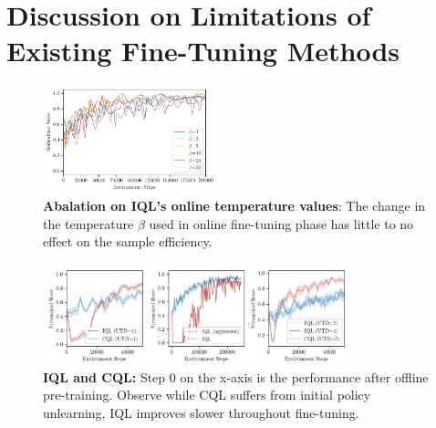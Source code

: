 \section{Discussion on Limitations of Existing Fine-Tuning Methods}
\label{appendix:more_discussion_on_finetuning}

\begin{figure}[h]
\begin{center}
\centerline{\includegraphics[width=0.45\textwidth]{chapters/cal_ql/figs-sample/iql-beta.pdf}}

\caption{\label{fig:beta_ablation}\footnotesize{\textbf{Abalation on IQL's online temperature values}: The change in the temperature $\beta$ used in online fine-tuning phase has little to no effect on the sample efficiency.}}
\end{center}
\vspace{-0.8cm}

\end{figure}

\begin{figure}[h]

\begin{center}
\centerline{\includegraphics[width=0.8\textwidth]{chapters/cal_ql/figs-sample/iql-analysis-final.png}}

\caption{\label{fig:cql_iql_finetune_app}\footnotesize{\textbf{IQL and CQL:} Step 0 on the x-axis is the performance after offline pre-training. Observe while CQL suffers from initial policy unlearning, IQL improves slower throughout fine-tuning.}}

\end{center}
\vspace{-0.9cm}

\end{figure}

